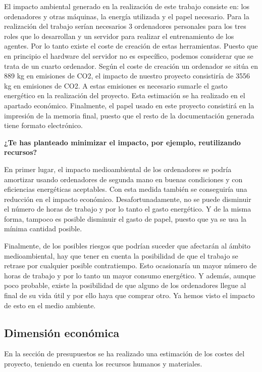 El impacto ambiental generado en la realización de este trabajo consiste en: los ordenadores y otras máquinas, la energía utilizada y el papel necesario. Para la realización del trabajo serían necesarios 3 ordenadores personales para los tres roles que lo desarrollan y un servidor para realizar el entrenamiento de los agentes. Por lo tanto existe el coste de creación de estas herramientas. Puesto que en principio el hardware del servidor no es específico, podemos considerar que se trata de un cuarto ordenador. Según \cite{coste_ordenador} el coste de creación un ordenador se sitúa en 889 kg en emisiones de CO2, el impacto de nuestro proyecto consistiría de 3556 kg en emisiones de CO2. A estas emisiones es necesario sumarle el gasto energético en la realización del proyecto. Esta estimación se ha realizado en el apartado económico. Finalmente, el papel usado en este proyecto consistirá en la impresión de la memoria final, puesto que el resto de la documentación generada tiene formato electrónico.  

\textbf{¿Te has planteado minimizar el impacto, por ejemplo, reutilizando recursos?}

En primer lugar, el impacto medioambiental de los ordenadores se podría amortizar usando ordenadores de segunda mano en buenas condiciones y con eficiencias energéticas aceptables. Con esta medida también se conseguiría una reducción en el impacto económico. Desafortunadamente, no se puede disminuir el número de horas de trabajo y por lo tanto el gasto energético. Y de la misma forma, tampoco es posible disminuir el gasto de papel, puesto que ya se usa la mínima cantidad posible. 

Finalmente, de los posibles riesgos que podrían suceder que afectarán al ámbito medioambiental, hay que tener en cuenta la posibilidad de que el trabajo se retrase por cualquier posible contratiempo. Esto ocasionaría un mayor número de horas de trabajo y por lo tanto un mayor consumo energético. Y además, aunque poco probable, existe la posibilidad de que alguno de los ordenadores llegue al final de su vida útil y por ello haya que comprar otro. Ya hemos visto el impacto de esto en el medio ambiente.

\subsection{Dimensión económica}

En la sección de presupuestos se ha realizado una estimación de los costes del proyecto, teniendo en cuenta los recursos humanos y materiales.

